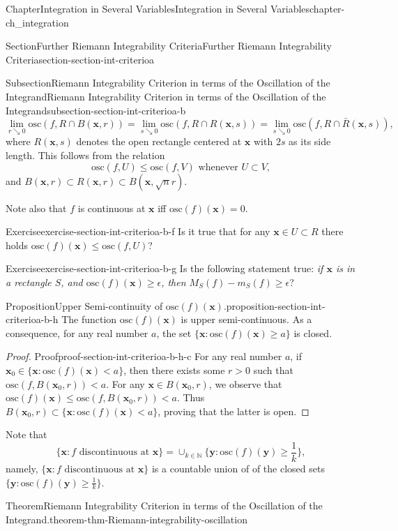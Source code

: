 \documentclass[oneside,10pt,]{book}
\numberwithin{equation}{section}
\newcommand{\bx}{\mathbf{x}}
\newcommand{\by}{\mathbf{y}}
\newcommand{\bbN}{\mathbb{N}}
\newcommand{\osc}{\text{osc}}
\begin{document}
\begin{chapterptx}{Chapter}{Integration in Several Variables}{}{Integration in Several Variables}{}{}{chapter-ch_integration}
\begin{sectionptx}{Section}{Further Riemann Integrability Criteria}{}{Further Riemann Integrability Criteria}{}{}{section-section-int-criterioa}
\begin{subsectionptx}{Subsection}{Riemann Integrability Criterion in terms of the Oscillation of the Integrand}{}{Riemann Integrability Criterion in terms of the Oscillation of the Integrand}{}{}{subsection-section-int-criterioa-b}
\begin{equation*}
\lim_{r\searrow 0} \osc(f, R\cap B(\bx, r))=\lim_{s\searrow 0} \osc(f, R\cap R(\bx, s))
=\lim_{s\searrow 0} \osc(f, R\cap \bar{R}(\bx, s))\text{,}
\end{equation*}
where \(R(\bx, s)\) denotes the open rectangle centered at \(\bx\) with \(2s\) as its side length.  This follows from the relation%
\begin{equation*}
\osc(f, U) \le \osc(f, V) \text{ whenever } U\subset V,
\end{equation*}
and \(B(\bx, r) \subset R(\bx, r) \subset B(\bx, \sqrt{n}r)\).%
\par
Note also that \(f\) is continuous at \(\bx\) iff \(\osc(f)(\bx)=0\).%
\begin{inlineexercise}{Exercise}{}{exercise-section-int-criterioa-b-f}%
Is it true that for any \(\bx \in U \subset R\) there holds \(\osc(f)(\bx)\le \osc(f, U)\)?%
\end{inlineexercise}%
\begin{inlineexercise}{Exercise}{}{exercise-section-int-criterioa-b-g}%
Is the following statement true: \emph{if \(\bx\) is in a rectangle \(S\), and \(\osc(f)(\bx)\ge \epsilon\), then \(M_{S}(f)-m_{S}(f)\ge \epsilon\)}?%
\end{inlineexercise}%
\begin{proposition}{Proposition}{Upper Semi-continuity of \(\osc(f)(\bx)\).}{}{proposition-section-int-criterioa-b-h}%
The function \(\osc(f)(\bx)\) is upper 	semi-continuous. As a consequence, for any real number \(a\), the set \(\{\bx: 	\osc(f)(\bx)\ge a \}\) is closed.\end{proposition}
\begin{proof}{Proof}{}{proof-section-int-criterioa-b-h-c}
For any real number \(a\), if \(\bx_{0}\in \{\bx: 	\osc(f)(\bx) < a\}\), then there exists some \(r>0\) such that \(\osc(f, B(\bx_{0}, r)) < a\). For any \(\bx \in B(\bx_{0}, r)\), we observe that \(\osc(f)(\bx)\le \osc(f, B(\bx_{0}, r)) < a\). Thus \(B(\bx_{0}, r) \subset \{\bx: 	\osc(f)(\bx) < a\}\), proving that the latter is open.%
\end{proof}
Note that%
\begin{equation}
\{\bx: f \text{ discontinuous at } \bx\}=
\cup_{k\in \bbN} \{\by: \osc(f)(\by)\ge \frac 1k\},\label{men-eqn-discont}
\end{equation}
namely, \(\{\bx: f \text{ discontinuous at } \bx\}\) is a countable union of of the closed sets \(\{\by: \osc(f)(\by)\ge \frac 1k\}\).%
\begin{theorem}{Theorem}{Riemann Integrability Criterion in terms of the Oscillation of the Integrand.}{}{theorem-thm-Riemann-integrability-oscillation}%

\end{theorem}
\end{subsectionptx}
\end{sectionptx}
\end{chapterptx}
\end{document}
